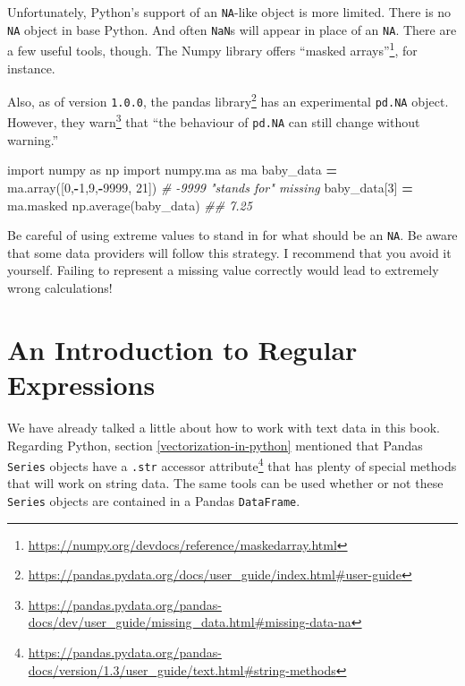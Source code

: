 \documentclass[12pt,krantz2]{krantz}
\makeatletter
\newenvironment{Shaded}{\begin{snugshade}}{\end{snugshade}}
\newcommand{\CommentTok}[1]{\textcolor[rgb]{0.37,0.37,0.37}{\textit{#1}}}
\newcommand{\DecValTok}[1]{\textcolor[rgb]{0.06,0.06,0.06}{#1}}
\newcommand{\ImportTok}[1]{#1}
\newcommand{\NormalTok}[1]{#1}
\newcommand{\OperatorTok}[1]{\textcolor[rgb]{0.43,0.43,0.43}{\textbf{#1}}}
\renewcommand{\href}[2]{#2\footnote{\url{#1}}}
\newenvironment{kframe}{%
\medskip{}
\setlength{\fboxsep}{.8em}
 \def\at@end@of@kframe{}%
 \ifinner\ifhmode%
  \def\at@end@of@kframe{\end{minipage}}%
  \begin{minipage}{\columnwidth}%
 \fi\fi%
 \def\FrameCommand##1{\hskip\@totalleftmargin \hskip-\fboxsep
 \colorbox{shadecolor}{##1}\hskip-\fboxsep
     \hskip-\linewidth \hskip-\@totalleftmargin \hskip\columnwidth}%
 \MakeFramed {\advance\hsize-\width
   \@totalleftmargin\z@ \linewidth\hsize
   \@setminipage}}%
 {\par\unskip\endMakeFramed%
 \at@end@of@kframe}
\renewenvironment{Shaded}{\begin{kframe}}{\end{kframe}}
\makeatother
\begin{document}
Unfortunately, Python's support of an \texttt{NA}-like object is more limited. There is no \texttt{NA} object in base Python. And often \texttt{NaN}s will appear in place of an \texttt{NA}. There are a few useful tools, though. The Numpy library offers \href{https://numpy.org/devdocs/reference/maskedarray.html}{``masked arrays''}, for instance.

Also, as of version \texttt{1.0.0}, the \href{https://pandas.pydata.org/docs/user_guide/index.html\#user-guide}{pandas library} has an experimental \texttt{pd.NA} object. However, they \href{https://pandas.pydata.org/pandas-docs/dev/user_guide/missing_data.html\#missing-data-na}{warn} that ``the behaviour of \texttt{pd.NA} can still change without warning.''

\begin{Shaded}
\begin{Highlighting}[]
\ImportTok{import}\NormalTok{ numpy }\ImportTok{as}\NormalTok{ np}
\ImportTok{import}\NormalTok{ numpy.ma }\ImportTok{as}\NormalTok{ ma}
\NormalTok{baby_data }\OperatorTok{=}\NormalTok{ ma.array([}\DecValTok{0}\NormalTok{,}\OperatorTok{-}\DecValTok{1}\NormalTok{,}\DecValTok{9}\NormalTok{,}\OperatorTok{-}\DecValTok{9999}\NormalTok{, }\DecValTok{21}\NormalTok{]) }\CommentTok{# -9999 "stands for" missing}
\NormalTok{baby_data[}\DecValTok{3}\NormalTok{] }\OperatorTok{=}\NormalTok{ ma.masked}
\NormalTok{np.average(baby_data)}
\CommentTok{## 7.25}
\end{Highlighting}
\end{Shaded}

\begin{rmd-caution}
Be careful of using extreme values to stand in for what should be an \texttt{NA}. Be aware that some data providers will follow this strategy. I recommend that you avoid it yourself. Failing to represent a missing value correctly would lead to extremely wrong calculations!

\end{rmd-caution}

\hypertarget{an-introduction-to-regular-expressions}{%
\section{An Introduction to Regular Expressions}\label{an-introduction-to-regular-expressions}}

We have already talked a little about how to work with text data in this book. Regarding Python, section \ref{vectorization-in-python} mentioned that Pandas \texttt{Series} objects have a \href{https://pandas.pydata.org/pandas-docs/version/1.3/user_guide/text.html\#string-methods}{\texttt{.str} accessor attribute} that has plenty of special methods that will work on string data. The same tools can be used whether or not these \texttt{Series} objects are contained in a Pandas \texttt{DataFrame}.
\end{document}
